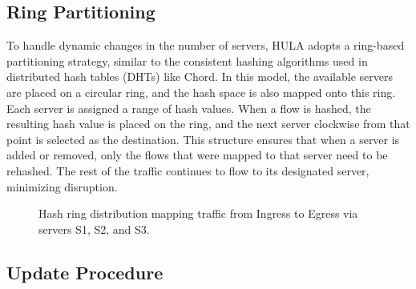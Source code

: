 \documentclass[12pt,a4paper]{article}
\begin{document}
\subsection{Ring Partitioning}

To handle dynamic changes in the number of servers, HULA adopts a ring-based partitioning strategy, similar to the consistent hashing algorithms used in distributed hash tables (DHTs) like Chord. In this model, the available servers are placed on a circular ring, and the hash space is also mapped onto this ring. Each server is assigned a range of hash values. When a flow is hashed, the resulting hash value is placed on the ring, and the next server clockwise from that point is selected as the destination. This structure ensures that when a server is added or removed, only the flows that were mapped to that server need to be rehashed. The rest of the traffic continues to flow to its designated server, minimizing disruption.

\begin{figure}[H]
  \centering
  \caption{Hash ring distribution mapping traffic from Ingress to Egress via servers S1, S2, and S3.}
  \label{fig:hash-ring}
\end{figure}

\subsection{Update Procedure}
\end{document}
